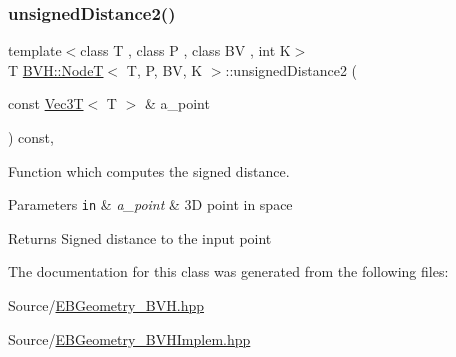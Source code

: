 \subsubsection{\texorpdfstring{unsigned\+Distance2()}{unsignedDistance2()}}
{\footnotesize\ttfamily template$<$class T , class P , class BV , int K$>$ \\
T \hyperlink{classBVH_1_1NodeT}{B\+V\+H\+::\+NodeT}$<$ T, P, BV, K $>$\+::unsigned\+Distance2 (\begin{DoxyParamCaption}\item[{const \hyperlink{classVec3T}{Vec3T}$<$ T $>$ \&}]{a\+\_\+point }\end{DoxyParamCaption}) const\hspace{0.3cm}{\ttfamily [inline]}, {\ttfamily [noexcept]}}



Function which computes the signed distance. 


\begin{DoxyParams}[1]{Parameters}
\mbox{\tt in}  & {\em a\+\_\+point} & 3D point in space \\
\hline
\end{DoxyParams}
\begin{DoxyReturn}{Returns}
Signed distance to the input point 
\end{DoxyReturn}


The documentation for this class was generated from the following files\+:\begin{DoxyCompactItemize}
\item 
Source/\hyperlink{EBGeometry__BVH_8hpp}{E\+B\+Geometry\+\_\+\+B\+V\+H.\+hpp}\item 
Source/\hyperlink{EBGeometry__BVHImplem_8hpp}{E\+B\+Geometry\+\_\+\+B\+V\+H\+Implem.\+hpp}\end{DoxyCompactItemize}
